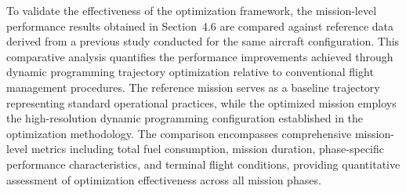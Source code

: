 To validate the effectiveness of the optimization framework, the mission-level performance results obtained in Section~4.6 are compared against reference data derived from a previous study conducted for the same aircraft configuration. This comparative analysis quantifies the performance improvements achieved through dynamic programming trajectory optimization relative to conventional flight management procedures. The reference mission serves as a baseline trajectory representing standard operational practices, while the optimized mission employs the high-resolution dynamic programming configuration established in the optimization methodology. The comparison encompasses comprehensive mission-level metrics including total fuel consumption, mission duration, phase-specific performance characteristics, and terminal flight conditions, providing quantitative assessment of optimization effectiveness across all mission phases.

